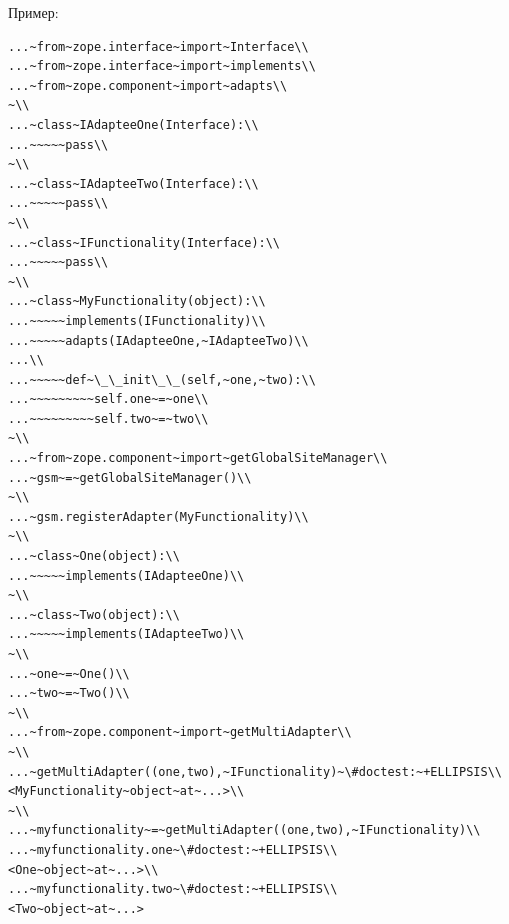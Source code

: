 \documentclass[a4paper,openany,twoside,draft]{book}
\begin{document}
Пример:

\begin{verbatim}
...~from~zope.interface~import~Interface\\
...~from~zope.interface~import~implements\\
...~from~zope.component~import~adapts\\
~\\
...~class~IAdapteeOne(Interface):\\
...~~~~~pass\\
~\\
...~class~IAdapteeTwo(Interface):\\
...~~~~~pass\\
~\\
...~class~IFunctionality(Interface):\\
...~~~~~pass\\
~\\
...~class~MyFunctionality(object):\\
...~~~~~implements(IFunctionality)\\
...~~~~~adapts(IAdapteeOne,~IAdapteeTwo)\\
...\\
...~~~~~def~\_\_init\_\_(self,~one,~two):\\
...~~~~~~~~~self.one~=~one\\
...~~~~~~~~~self.two~=~two\\
~\\
...~from~zope.component~import~getGlobalSiteManager\\
...~gsm~=~getGlobalSiteManager()\\
~\\
...~gsm.registerAdapter(MyFunctionality)\\
~\\
...~class~One(object):\\
...~~~~~implements(IAdapteeOne)\\
~\\
...~class~Two(object):\\
...~~~~~implements(IAdapteeTwo)\\
~\\
...~one~=~One()\\
...~two~=~Two()\\
~\\
...~from~zope.component~import~getMultiAdapter\\
~\\
...~getMultiAdapter((one,two),~IFunctionality)~\#doctest:~+ELLIPSIS\\
<MyFunctionality~object~at~...>\\
~\\
...~myfunctionality~=~getMultiAdapter((one,two),~IFunctionality)\\
...~myfunctionality.one~\#doctest:~+ELLIPSIS\\
<One~object~at~...>\\
...~myfunctionality.two~\#doctest:~+ELLIPSIS\\
<Two~object~at~...>
\end{verbatim}
\end{document}
